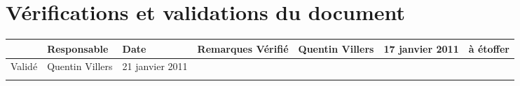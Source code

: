 \documentclass[twoside]{article}
\begin{document}


\section*{Vérifications et validations du document}

\begin{center}
\begin{longtable}{|m{15mm}|m{36mm}|m{36mm}|m{60mm}|}
\hline
 & Responsable & Date & Remarques\endhead \hline
Vérifié
& %
Quentin Villers
& %
17 janvier 2011
& %
à  étoffer
\\\hline
Validé
& %
Quentin Villers
& %
21 janvier 2011
& %

\\\hline

& %

& %

& %

\\\hline
\end{longtable}
\end{center}

\pagebreak


\tableofcontents
\vfill
\pagebreak





\end{document}

